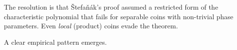 \noindent The resolution is that \v{S}tefa\v{n}\'ak's proof assumed a
restricted form of the characteristic polynomial that fails for
separable coins with non-trivial phase parameters. Even \emph{local}
(product) coins evade the theorem.

A clear empirical pattern emerges.
